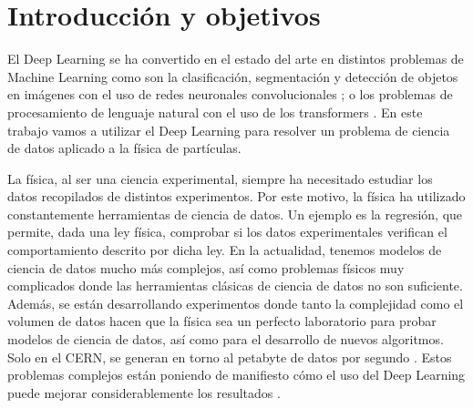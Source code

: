 \documentclass[a4paper,12pt,oneside,titlepage]{book}
\begin{document}




\tableofcontents
\newpage


\newpage
\mainmatter
\chapter{Introducción y objetivos}


El Deep Learning se ha convertido en el estado del arte en distintos problemas de Machine Learning como son la clasificación, segmentación y detección de objetos en imágenes con el uso de redes neuronales convolucionales \cite{detection1, detection3}; o los problemas de procesamiento de lenguaje natural con el uso de los transformers \cite{transformers, gpt3, trans_review}. En este trabajo vamos a utilizar el Deep Learning para resolver un problema de ciencia de datos aplicado a la física de partículas.

La física, al ser una ciencia experimental, siempre ha necesitado estudiar los datos recopilados de distintos experimentos. Por este motivo, la física ha utilizado constantemente herramientas de ciencia de datos. Un ejemplo es la regresión, que permite, dada una ley física, comprobar si los datos experimentales verifican el comportamiento descrito por dicha ley. En la actualidad, tenemos modelos de ciencia de datos mucho más complejos, así como problemas físicos muy complicados donde las herramientas clásicas de ciencia de datos no son suficiente. Además, se están desarrollando experimentos donde tanto la complejidad como el volumen de datos hacen que la física sea un perfecto laboratorio para probar modelos de ciencia de datos, así como para el desarrollo de nuevos algoritmos. Solo en el CERN, se generan en torno al petabyte de datos por segundo \cite{ml_phy}. Estos problemas complejos están poniendo de manifiesto cómo el uso del Deep Learning puede mejorar considerablemente los resultados \cite{ml_phy}.
\end{document}

